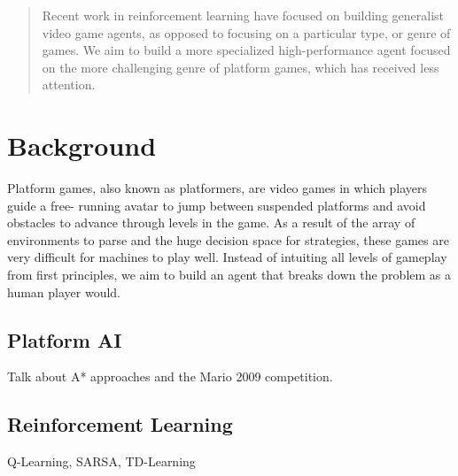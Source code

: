 \documentclass{article}
\begin{document}
 


\begin{abstract} 
Recent work in reinforcement learning have focused on building generalist video game agents, as opposed to focusing on a particular type, or genre of games. We aim to build a more specialized high-performance agent focused on the more challenging genre of platform games, which has received less attention.
\end{abstract} 



\section{Background}
Platform games, also known as platformers, are video games in which players guide a free- running avatar to jump between suspended platforms and avoid obstacles to advance through levels in the game. As a result of the array of environments to parse and the huge decision space for strategies, these games are very difficult for machines to play well. Instead of intuiting all levels of gameplay from first principles, we aim to build an agent that breaks down the problem as a human player would.

\subsection{Platform AI}
Talk about A* approaches and the Mario 2009 competition.

\subsection{Reinforcement Learning}
Q-Learning, SARSA, TD-Learning
\end{document}

